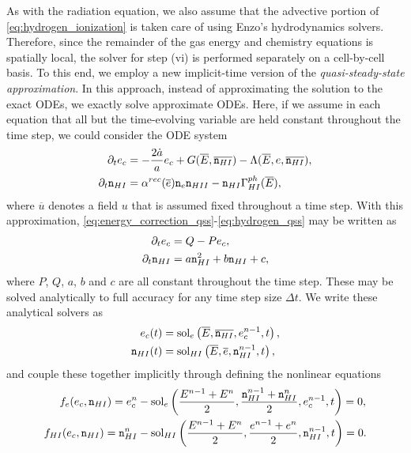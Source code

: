 \documentclass[letterpaper,10pt]{article}
\renewcommand{\(}{\left(}
\renewcommand{\)}{\right)}
\newcommand{\dt}{\Delta t}
\newcommand{\mn}{{\tt n}}
\begin{document}
As with the radiation equation, we also assume that the advective
portion of \eqref{eq:hydrogen_ionization} is taken care of using
Enzo's hydrodynamics solvers.  Therefore, since the remainder of the
gas energy and chemistry equations is spatially local, the solver for
step (vi) is performed separately on a cell-by-cell basis.  To this
end, we employ a new implicit-time version of the 
{\em quasi-steady-state approximation}.  In this approach, instead of
approximating the solution to the exact ODEs, we exactly solve
approximate ODEs.  Here, if we assume in each equation that all but the
time-evolving variable are held constant throughout the time step, we
could consider the ODE system 
\begin{align}
  \label{eq:energy_correction_qss}
  \partial_t e_c &= -\frac{2\dot{a}}{a}e_c + G(\overline{E},\overline{\mn_{HI}}) - \Lambda(\overline{E},e,\overline{\mn_{HI}}), \\
  \label{eq:hydrogen_qss}
  \partial_t \mn_{HI} &= \alpha^{rec}(\overline{e}) \mn_e \mn_{HII} - \mn_{HI} \Gamma_{HI}^{ph}(\overline{E}),
\end{align}
where $\overline{u}$ denotes a field $u$ that is assumed fixed
throughout a time step.  With this approximation,
\eqref{eq:energy_correction_qss}-\eqref{eq:hydrogen_qss} may be
written as
\begin{align}
  \label{eq:energy_correction_qss2}
  \partial_t e_c &= Q - Pe_c, \\
  \label{eq:hydrogen_qss2}
  \partial_t \mn_{HI} &= a \mn_{HI}^2 + b\mn_{HI} + c,
\end{align}
where $P$, $Q$, $a$, $b$ and $c$ are all constant throughout the time
step.  These may be solved analytically to full accuracy for any time step
size $\dt$.  We write these analytical solvers as
\begin{align}
  \label{eq:energy_correction_qss3}
  e_c(t) &= \text{sol}_e\left(\overline{E},\overline{\mn_{HI}},e_c^{n-1},t\right), \\
  \label{eq:hydrogen_qss3}
  \mn_{HI}(t) &= \text{sol}_{HI}\left(\overline{E},\overline{e},\mn_{HI}^{n-1},t\right),
\end{align}
and couple these together implicitly through defining the nonlinear
equations 
\begin{align}
  \label{eq:energy_correction_iqss}
  f_e(e_c,\mn_{HI}) = e_c^n &- \text{sol}_e\left(\frac{E^{n-1}+E^n}{2},\frac{\mn_{HI}^{n-1}+\mn_{HI}^n}{2},e_c^{n-1},t\right) = 0, \\
  \label{eq:hydrogen_iqss}
  f_{HI}(e_c,\mn_{HI}) = \mn_{HI}^n &- \text{sol}_{HI}\left(\frac{E^{n-1}+E^n}{2},\frac{e^{n-1}+e^n}{2},\mn_{HI}^{n-1},t\right) = 0.
\end{align}
\end{document}
